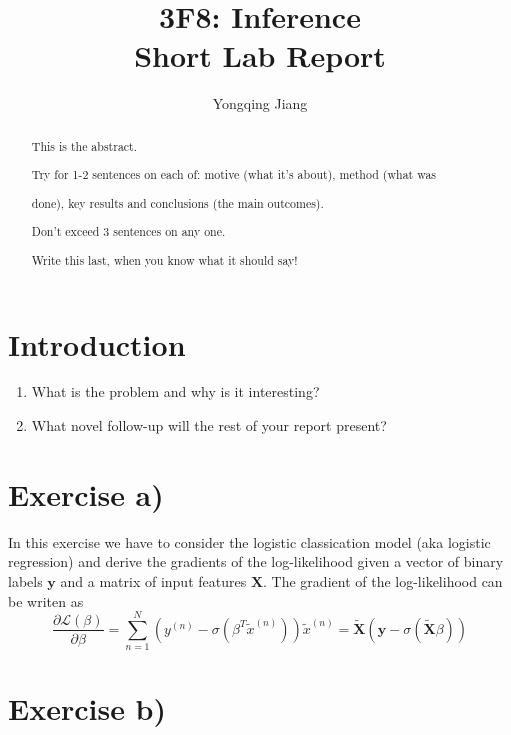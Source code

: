 \documentclass[english]{article}
\begin{document}
\title{3F8: Inference\\
 Short Lab Report}

\author{Yongqing Jiang}
\maketitle
\begin{abstract}
This is the abstract. 

Try for 1-2 sentences on each of: motive (what it\textquoteright s
about), method (what was

done), key results and conclusions (the main outcomes).

\textbullet{} Don\textquoteright t exceed 3 sentences on any one.

\textbullet{} Write this last, when you know what it should say!
\end{abstract}

\section{Introduction}
\begin{enumerate}
\item What is the problem and why is it interesting?
\item What novel follow-up will the rest of your report present?
\end{enumerate}

\section{Exercise a)\label{sec:Exercise-a}}

In this exercise we have to consider the logistic classication model
(aka logistic regression) and derive the gradients of the log-likelihood
given a vector of binary labels $\mathbf{y}$ and a matrix of input
features $\mathbf{X}$. The gradient of the log-likelihood can be
writen as
\begin{equation*}
   \frac{\partial\mathcal{L}(\beta)}{\partial\beta}=
   \sum_{n=1}^{N} (y^{(n)} - \sigma(\beta^T \tilde{x}^{(n)}))\tilde{x}^{(n)}
   = \tilde{\mathbf{X}} (\mathbf{y} - \sigma(\tilde{\mathbf{X}}\beta ))
\end{equation*}




\section{Exercise b)}
\end{document}

